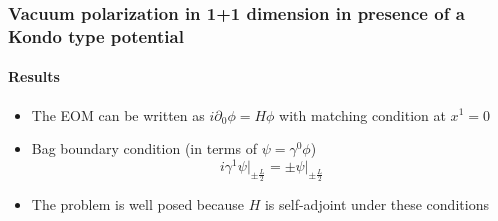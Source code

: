 \documentclass[french]{beamer}
\begin{document}
\begin{frame}
\frametitle{Vacuum polarization in 1+1 dimension in presence of a Kondo type potential}
\framesubtitle{Results}

\begin{itemize}
\item The EOM can be written as $i\partial_0\phi = H\phi$ with matching condition at $x^1 = 0$ 


\item Bag boundary condition (in terms of $\psi = \gamma^0\phi$)
\begin{equation*}
i\gamma^1 \psi \Big\vert_{\pm \frac{L}{2}} = \pm \psi \Big\vert_{\pm \frac{L}{2}}
\end{equation*}

\item The problem is well posed because $H$ is self-adjoint under these conditions

\end{itemize}

\end{frame}
\end{document}
